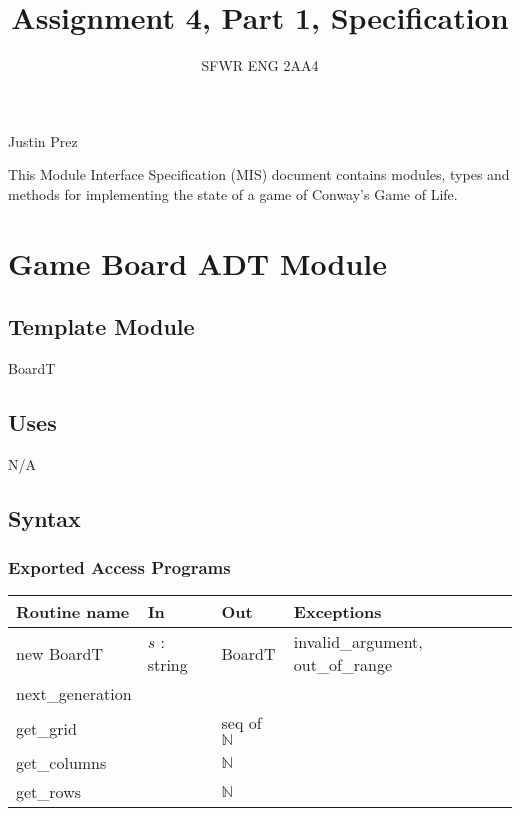 \documentclass[12pt]{article}
\title{Assignment 4, Part 1, Specification}
\author{SFWR ENG 2AA4}
\begin{document}
\maketitle

\begin{center}
Justin Prez
\end{center}

\bigskip
This Module Interface Specification (MIS) document contains modules, types and
methods for implementing the state of a game of Conway's Game of Life.

\newpage

\section* {Game Board ADT Module}

\subsection*{Template Module}

BoardT

\subsection* {Uses}

N/A

\subsection* {Syntax}

\subsubsection* {Exported Access Programs}

\begin{tabular}{| l | l | l | l |}
\hline
\textbf{Routine name} & \textbf{In} & \textbf{Out} & \textbf{Exceptions}\\
\hline
new BoardT & $s$ : string & BoardT & invalid\_argument, out\_of\_range\\
\hline
next\_generation & & & \\
\hline
get\_grid & & seq of $\mathbb{N}$  & \\
\hline
get\_columns & & $\mathbb{N}$ & \\
\hline
get\_rows & & $\mathbb{N}$ & \\
\hline
\end{tabular}
\end{document}
